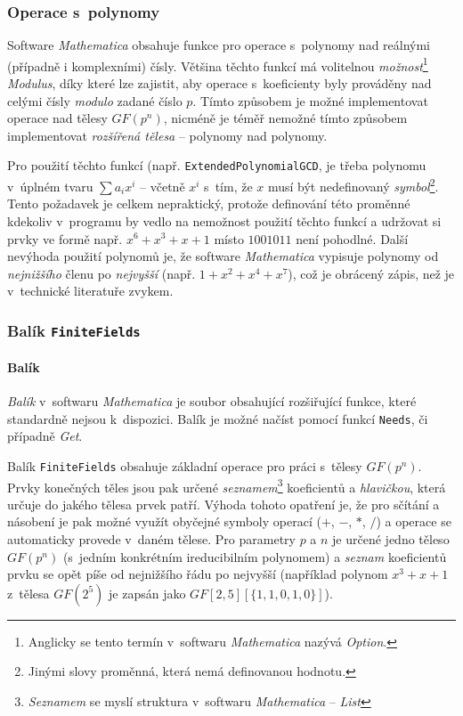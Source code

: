 \documentclass[thesis=M,czech,hidelinks]{FITthesis}[2012/06/26]
\begin{document}
\subsubsection{Operace s~polynomy}
Software \emph{Mathematica} obsahuje funkce pro operace s~polynomy nad reálnými
(případně i komplexními) čísly. Většina těchto funkcí má volitelnou
\emph{možnost}\footnote{
Anglicky se tento termín v~softwaru \emph{Mathematica}
nazývá \emph{Option}.
} \emph{Modulus}, díky které lze zajistit, aby operace s~koeficienty byly prováděny
nad celými čísly \emph{modulo} zadané číslo $p$. Tímto způsobem je možné
implementovat operace nad tělesy $GF(p^n)$, nicméně je téměř nemožné
tímto způsobem implementovat \emph{rozšířená tělesa} -- polynomy nad polynomy.

Pro použití těchto funkcí (např. \texttt{ExtendedPolynomialGCD}, je třeba
polynomu v~úplném tvaru $\sum a_i x^i$ -- včetně $x^i$ s~tím, že $x$ musí být
nedefinovaný \emph{symbol}\footnote{
Jinými slovy proměnná, která nemá definovanou hodnotu.
}. Tento požadavek je celkem nepraktický, protože definování této proměnné
kdekoliv v~programu by vedlo na nemožnost použití těchto funkcí a udržovat si
prvky ve formě např. $x^6 + x^3 + x + 1$ místo $1001011$ není pohodlné.
Další nevýhoda použití polynomů je, že software \emph{Mathematica} vypisuje
polynomy od \emph{nejnižšího} členu po \emph{nejvyšší} (např. $1+x^2+x^4+x^7$),
což je obrácený zápis, než je v~technické literatuře zvykem.

\subsubsection{Balík \texttt{FiniteFields}}
\paragraph{Balík} \emph{Balík} v~softwaru \emph{Mathematica} je soubor obsahující
rozšiřující funkce, které standardně nejsou k~dispozici. Balík je možné načíst
pomocí funkcí \texttt{Needs}, či případně \emph{Get}.

Balík \texttt{FiniteFields} obsahuje základní operace pro práci s~tělesy
$GF(p^n)$. Prvky konečných těles jsou pak určené \emph{seznamem}\footnote{
\emph{Seznamem} se myslí struktura v~softwaru \emph{Mathematica} -- \emph{List}
} koeficientů a \emph{hlavičkou}, která určuje do jakého tělesa prvek patří.
Výhoda tohoto opatření je, že pro sčítání a násobení je pak možné využít
obyčejné symboly operací ($+$, $-$, $*$, $/$) a operace se automaticky provede
v~daném tělese.  Pro parametry $p$ a $n$ je určené jedno těleso $GF(p^n)$
(s~jedním konkrétním ireducibilním polynomem) a \emph{seznam} koeficientů prvku
se opět píše od nejnižšího řádu po nejvyšší (například polynom $x^3 + x + 1$
z~tělesa $GF(2^5)$ je zapsán jako $GF[2,5][\{1,1,0,1,0\}] $).
\end{document}
